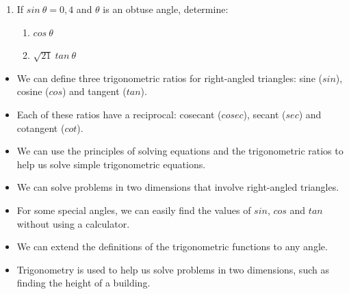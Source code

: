 \begin{exercises}{}
{\begin{enumerate}[itemsep=5pt, label=\textbf{\arabic*}. ]
\item If $sin~\theta= 0,4$ and $\theta$ is an obtuse angle, determine:
\begin{enumerate}[noitemsep, label=\textbf{(\alph*)} ]
 \item $cos~\theta$
\item $\sqrt{21}~tan~\theta$
\end{enumerate}
\end{enumerate}
}
\end{exercises}

\summary
\begin{itemize}[noitemsep]
\item We can define three trigonometric ratios for right-angled triangles: sine ($sin$), cosine ($cos$) and tangent ($tan$).
\item Each of these ratios have a reciprocal: cosecant ($cosec$), secant ($sec$) and cotangent ($cot$).
\item We can use the principles of solving equations and the trigonometric ratios to help us solve simple trigonometric equations.
\item We can solve problems in two dimensions that involve right-angled triangles.
\item For some special angles, we can easily find the values of $sin$, $cos$ and $tan$ without using a calculator.
\item We can extend the definitions of the trigonometric functions to any angle.
\item Trigonometry is used to help us solve problems in two dimensions, such as finding the height of a building.
\end{itemize}


